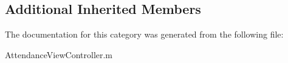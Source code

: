 \subsection*{Additional Inherited Members}


The documentation for this category was generated from the following file\+:\begin{DoxyCompactItemize}
\item 
Attendance\+View\+Controller.\+m\end{DoxyCompactItemize}
